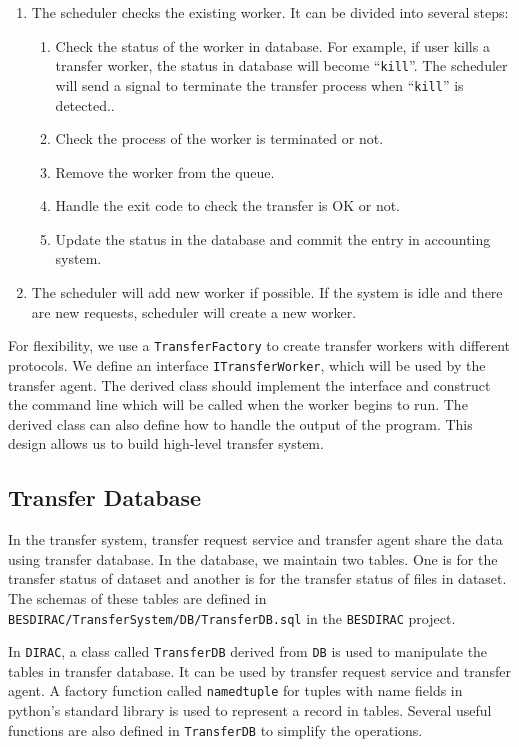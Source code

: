\begin{enumerate}
\item The scheduler checks the existing worker.
It can be divided into several steps:
\begin{enumerate}
    \item Check the status of the worker in database.
          For example, if user kills a transfer worker, the status in
          database will become ``\verb"kill"''.
          The scheduler will
          send a signal to terminate the
          transfer process when ``\verb"kill"'' is detected..
    \item Check the process of the worker is terminated or not.
    \item Remove the worker from the queue.
    \item Handle the exit code to check the transfer is OK or not.
    \item Update the status in the database 
          and commit the entry in accounting system.
\end{enumerate}
\item The scheduler will add new worker if possible.
If the system is idle and there are new requests,
scheduler will create a new worker.
\end{enumerate}
For flexibility, we use a {\tt TransferFactory} to create transfer workers
with different protocols. 
We define an interface {\tt ITransferWorker},
which will be used by the transfer agent. The derived class should
implement the interface and construct the command line which will 
be called when the worker begins to run.
The derived class can also define how to handle the output of the 
program.
This design allows us to build high-level transfer system.

\subsection{Transfer Database}

In the transfer system, transfer request service and transfer agent
share the data using transfer database. In the database, we maintain
two tables.
One is for the transfer status of dataset 
and another is for the transfer status of files in dataset. 
The schemas of these tables are defined 
in {\tt BESDIRAC/TransferSystem/DB/TransferDB.sql} in the {\tt BESDIRAC}
project\cite{bib:besdirac}.

In {\tt DIRAC}, a class called {\tt TransferDB} 
derived from {\tt DB} is used to manipulate
the tables in transfer database.
It can be used by transfer request 
service and transfer agent. A factory function called \verb"namedtuple" 
for tuples with name fields
in python's standard library
is used to represent a record in tables.
Several useful functions are also defined in {\tt TransferDB}
to simplify the operations.
